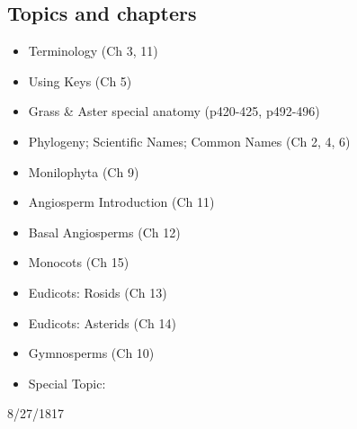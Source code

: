 \documentclass{tufte-handout}
\begin{document}
\begin{fullwidth}
\subsection{Topics and chapters}

\begin{itemize}
	\item Terminology (Ch 3, 11)
	\item Using Keys (Ch 5)
	\item Grass \& Aster special anatomy (p420-425, p492-496)
	\item Phylogeny; Scientific Names; Common Names (Ch 2, 4, 6)
	\item Monilophyta (Ch 9)
	\item Angiosperm Introduction (Ch 11)
	\item Basal Angiosperms (Ch 12)
	\item Monocots (Ch 15)
	\item Eudicots: Rosids (Ch 13)
	\item Eudicots: Asterids (Ch 14)
	\item Gymnosperms (Ch 10)
	\item Special Topic: 
\end{itemize}

\newpage
  \setlength{\calwidth}{6.5in}
  \setlength{\calboxdepth}{0.20in}
  \begin{calendar}{8/27/18}{17}

  \calday[Monday]{\classday} %
  \calday[Tuesday]{\classday} %
  \calday[Wednesday]{\classday}
  \calday[Thursday]{\classday} %
  \calday[Friday]{\classday} %
    \skipday\skipday %








\end{calendar}
\end{fullwidth}
\end{document}
